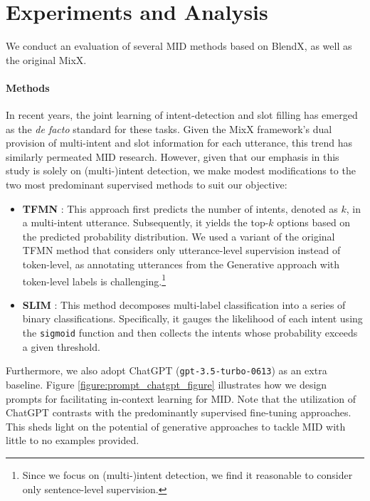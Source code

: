 \section{Experiments and Analysis}
\label{sec:experiments_analysis}

We conduct an evaluation of several MID methods based on BlendX, as well as the original MixX. 

\paragraph{Methods} 
In recent years, the joint learning of intent-detection and slot filling has emerged as the \textit{de facto} standard for these tasks.
Given the MixX framework's dual provision of multi-intent and slot information for each utterance, this trend has similarly permeated MID research. \cite{Cheng_2023,Tu_2023,chen-etal-2022-transformer,xing-tsang-2022-co,9747843,qin-etal-2021-gl,jiang-etal-2023-spm}
However, given that our emphasis in this study is solely on (multi-)intent detection, we make modest modifications to the two most predominant supervised methods to suit our objective:
\begin{itemize}
    \item \textbf{TFMN} \cite{chen-etal-2022-transformer,Cheng_2023}: 
    This approach first predicts the number of intents, denoted as $k$, in a multi-intent utterance. 
    Subsequently, it yields the top-$k$ options based on the predicted probability distribution.
    We used a variant of the original TFMN method that considers only utterance-level supervision instead of token-level, as annotating utterances from the Generative approach with token-level labels is challenging.\footnote{Since we focus on (multi-)intent detection, we find it reasonable to consider only sentence-level supervision.}
    \item \textbf{SLIM} \cite{9747477}: 
    This method decomposes multi-label classification into a series of binary classifications. 
    Specifically, it gauges the likelihood of each intent using the \texttt{sigmoid} function and then collects the intents whose probability exceeds a given threshold.
\end{itemize}

Furthermore, we also adopt ChatGPT (\texttt{gpt-3.5-turbo-0613}) as an extra baseline.
Figure \ref{figure:prompt_chatgpt_figure} illustrates how we design prompts for facilitating in-context learning for MID.
Note that the utilization of ChatGPT contrasts with the predominantly supervised fine-tuning approaches.
This sheds light on the potential of generative approaches to tackle MID with little to no examples provided.

